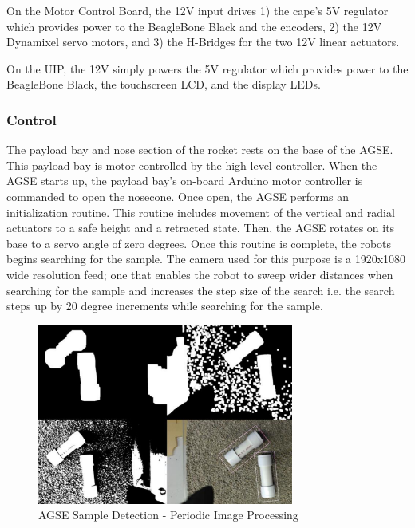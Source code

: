 On the Motor Control Board, the 12V input drives 1) the cape's 5V
regulator which provides power to the BeagleBone Black and the
encoders, 2) the 12V Dynamixel servo motors, and 3) the H-Bridges for
the two 12V linear actuators.

On the UIP, the 12V simply powers the 5V regulator which provides
power to the BeagleBone Black, the touchscreen LCD, and the display
LEDs.

\subsubsection{Control}

The payload bay and nose section of the rocket rests on the base of
the AGSE. This payload bay is motor-controlled by the high-level
controller. When the AGSE starts up, the payload bay's on-board Arduino motor controller is
commanded to open the nosecone. Once open, the AGSE performs an initialization
routine. This routine includes movement of the vertical and radial
actuators to a safe height and a retracted state. Then, the AGSE
rotates on its base to a servo angle of zero degrees. Once this
routine is complete, the robots begins searching for the sample. The
camera used for this purpose is a 1920x1080 wide resolution feed; one
that enables the robot to sweep wider distances when searching for the
sample and increases the step size of the search i.e. the search steps
up by 20 degree increments while searching for the sample.

\begin{figure}[h]
	\centering
	\includegraphics[width=0.75\textwidth]{Figures/Sample_Image_Processing_2.png}
	\caption{AGSE Sample Detection - Periodic Image Processing}
	\label{fig:Sample_Image_Processing_2}
\end{figure}

